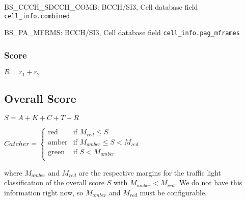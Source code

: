 \documentclass[a4paper,11pt,notitlepage,bigheadings,oneside]{scrartcl}
\begin{document}
BS\_CCCH\_SDCCH\_COMB: BCCH/SI3, Cell database field \verb|cell_info.combined|

BS\_PA\_MFRMS: BCCH/SI3, Cell database field \verb|cell_info.pag_mframes|

\subsubsection{Score}

$R = r_1 + r_2$

\subsection{Overall Score}

$S = A + K + C + T + R$

$Catcher =
\begin{cases}
	\text{red}   & \text{if } M_{red} \leq S \\
        \text{amber} & \text{if } M_{amber} \leq S < M_{red} \\
        \text{green} & \text{if } S < M_{amber} \\
\end{cases}
$

where $M_{amber}$ and $M_{red}$ are the respective margins for the traffic
light classification of the overall score $S$ with $M_{amber} < M_{red}$. We do
not have this information right now, so $M_{amber}$ and $M_{red}$ must be
configurable.



\end{document}
